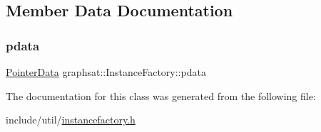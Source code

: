\subsection{Member Data Documentation}
\mbox{\label{classgraphsat_1_1_instance_factory_a869120dc983d8c65a57e64176f4aa752}} 
\subsubsection{\texorpdfstring{pdata}{pdata}}
{\footnotesize\ttfamily \mbox{\hyperlink{namespacegraphsat_a107ef8404e59d9b9e5c375face044c42}{Pointer\+Data}} graphsat\+::\+Instance\+Factory\+::pdata\hspace{0.3cm}{\ttfamily [private]}}



The documentation for this class was generated from the following file\+:\begin{DoxyCompactItemize}
\item 
include/util/\mbox{\hyperlink{instancefactory_8h}{instancefactory.\+h}}\end{DoxyCompactItemize}
